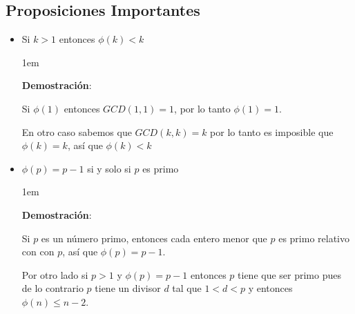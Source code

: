 \documentclass[12pt, fleqn]{report}                             %
\newenvironment{SmallIndentation}[1][0.75em]                    %
    {\begin{adjustwidth}{#1}{}\begin{footnotesize}}                 %
    {\end{footnotesize}\end{adjustwidth}}                           %
\begin{document}
        \subsection{Proposiciones Importantes}

            \begin{itemize}

                \item Si $k > 1$ entonces $\phi(k) < k$
                
                    \begin{SmallIndentation}[1em]
                        \textbf{Demostración}:

                        Si $\phi(1)$ entonces $GCD(1,1) = 1$, por lo tanto
                        $\phi(1)=1$.

                        En otro caso sabemos que $GCD(k, k) = k$ por lo tanto
                        es imposible que $\phi(k)=k$, así que $\phi(k) < k$

                    \end{SmallIndentation}


                \item $\phi(p) = p - 1$ si y solo si $p$ es primo

                    \begin{SmallIndentation}[1em]
                        \textbf{Demostración}:

                        Si $p$ es un número primo, entonces cada entero menor
                        que $p$ es primo relativo con con $p$, así que 
                        $\phi(p) = p-1$.

                        Por otro lado si $p>1$ y $\phi(p) = p-1$ entonces $p$
                        tiene que ser primo pues de lo contrario $p$ tiene
                        un divisor $d$ tal que $1<d<p$ y entonces
                        $\phi(n) \leq n-2$.

                    \end{SmallIndentation}

            \end{itemize}





\end{document}
